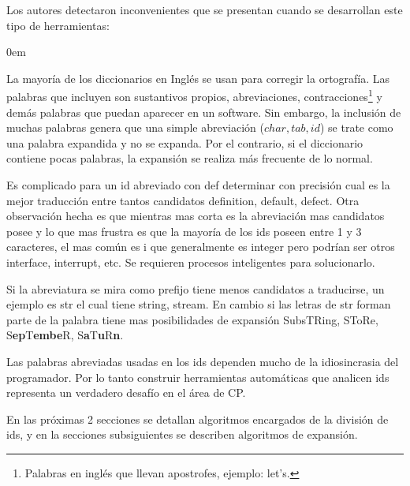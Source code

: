 \documentclass[a4paper,12pt]{report}
\begin{document}
Los autores detectaron inconvenientes que se presentan cuando se desarrollan este tipo de herramientas:

\begin{description}
\itemsep0em%
\item[Dificultad para armar diccionarios apropiados:]  La mayoría de los diccionarios en Inglés se usan para corregir la ortografía. Las palabras que incluyen son sustantivos propios, abreviaciones, contracciones\footnote[1]{Palabras en inglés que llevan apostrofes, ejemplo: let's.} y demás palabras que puedan aparecer en un software. Sin embargo, la inclusión de muchas palabras genera que una simple abreviación ($char,tab,id$) se trate como una palabra expandida y no se expanda. Por el contrario, si el diccionario contiene pocas palabras, la expansión se realiza más frecuente de lo normal.

\item[Las abreviaciones poseen muchos candidatos a expandir:] Es complicado para un id abreviado con \textsf{def} determinar con precisión cual es la mejor traducción entre tantos candidatos \textsf{definition, default, defect}. Otra observación hecha es que mientras mas corta es la abreviación mas candidatos posee y lo que mas frustra es que la mayoría de los ids poseen entre 1 y 3 caracteres, el mas común es \textsf{i} que generalmente es \textsf{integer} pero podrían ser otros \textsf{interface, interrupt}, etc. Se requieren procesos inteligentes para solucionarlo.
\pagebreak
\item[El tipo de la abreviación afecta el número de candidatos:] Si la abreviatura se mira como prefijo tiene menos candidatos a traducirse, un ejemplo es \textsf{str} el cual tiene \textsf{string, stream}. En cambio si las letras de \textsf{str} forman parte de la palabra tiene mas posibilidades de expansión S\textsf{ubs}TR\textsf{ing}, ST\textsf{o}R\textsf{e}, S\textbf{ep}T\textbf{embe}R, S\textbf{a}T\textbf{u}R\textbf{n}.
\end{description}


Las palabras abreviadas usadas en los ids dependen mucho de la idiosincrasia del programador. Por lo tanto construir herramientas automáticas que analicen ids representa un verdadero desafío en el área de CP.

En las próximas 2 secciones se detallan algoritmos encargados de la división de ids, y en la secciones subsiguientes se describen algoritmos de expansión.
\end{document}
